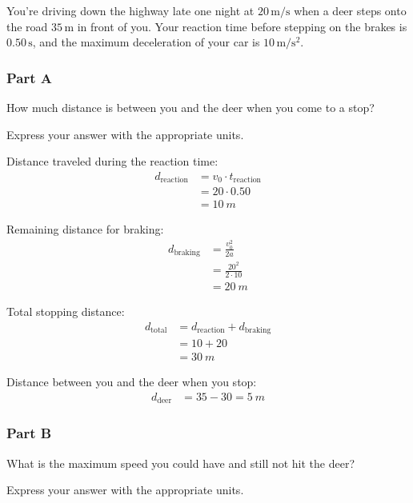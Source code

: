 You're driving down the highway late one night at \( 20 \, \mathrm{m/s} \) when a deer steps onto the road \( 35 \, \mathrm{m} \) in front of you. Your reaction time before stepping on the brakes is \( 0.50 \, \mathrm{s} \), and the maximum deceleration of your car is \( 10 \, \mathrm{m/s^2} \).

\subsubsection{Part A}
How much distance is between you and the deer when you come to a stop?

Express your answer with the appropriate units.

\begin{solution}
	Distance traveled during the reaction time:
	\begin{align*}
		d_{\mathrm{reaction}} &= v_0 \cdot t_{\mathrm{reaction}} \\
		&= 20 \cdot 0.50 \\
		&= \SI{10}{m}
	\end{align*}

	Remaining distance for braking:
	\begin{align*}
		d_{\mathrm{braking}} &= \frac{v_0^2}{2a} \\
		&= \frac{20^2}{2 \cdot 10} \\
		&= \SI{20}{m}
	\end{align*}

	Total stopping distance:
	\begin{align*}
		d_{\mathrm{total}} &= d_{\mathrm{reaction}} + d_{\mathrm{braking}} \\
		&= 10 + 20 \\
		&= \SI{30}{m}
	\end{align*}

	Distance between you and the deer when you stop:
	\begin{align*}
		d_{\mathrm{deer}} &= 35 - 30 = \boxed{\SI{5}{m}}
	\end{align*}
\end{solution}

\subsubsection{Part B}
What is the maximum speed you could have and still not hit the deer?

Express your answer with the appropriate units.

